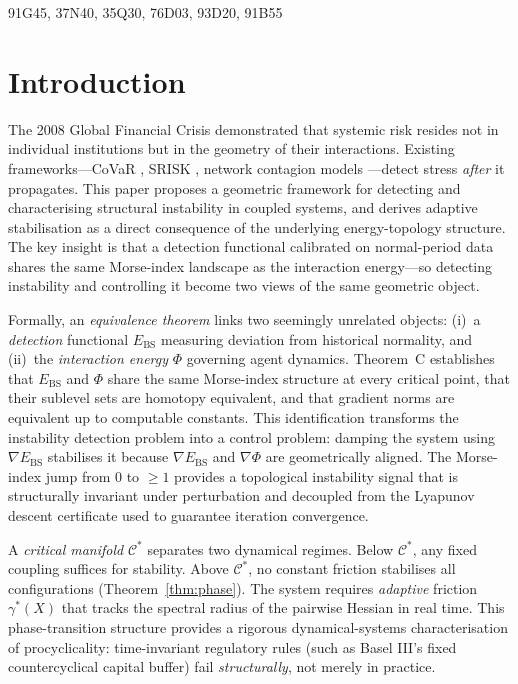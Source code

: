 \documentclass[final]{siamltex}
\providecommand{\grad}{\nabla}
\newcommand{\Ebs}{E_{\mathrm{BS}}}
\newcommand{\Cman}{\mathcal{C}^*}
\begin{document}
\begin{AMS}
91G45, 37N40, 35Q30, 76D03, 93D20, 91B55
\end{AMS}

\section{Introduction}\label{sec:intro}

The 2008 Global Financial Crisis demonstrated that systemic risk
resides not in individual institutions but in the geometry of
their interactions. Existing frameworks---CoVaR
\cite{adrian2016covar}, SRISK \cite{brownlees2017srisk},
network contagion models \cite{acemoglu2015systemic,
elliott2014financial}---detect stress \emph{after} it
propagates. This paper proposes a geometric framework for
detecting and characterising structural instability in coupled
systems, and derives adaptive stabilisation as a direct consequence
of the underlying energy-topology structure.  The key insight is
that a detection functional calibrated on normal-period data
shares the same Morse-index landscape as the interaction
energy---so detecting instability and controlling it become two
views of the same geometric object.

Formally, an \emph{equivalence theorem} links two seemingly
unrelated objects: (i)~a \emph{detection} functional $\Ebs$
measuring deviation from historical normality, and (ii)~the
\emph{interaction energy} $\Phi$ governing agent dynamics.
Theorem~C establishes that $\Ebs$ and $\Phi$ share the same
Morse-index structure at every critical point, that their sublevel
sets are homotopy equivalent, and that gradient norms are equivalent
up to computable constants.  This identification transforms
the instability detection problem into a control problem: damping
the system using $\grad\Ebs$ stabilises it because $\grad\Ebs$ and
$\grad\Phi$ are geometrically aligned.  The Morse-index jump from
$0$ to $\ge 1$ provides a topological instability signal that is
structurally invariant under perturbation and decoupled from the
Lyapunov descent certificate used to guarantee iteration
convergence.

A \emph{critical manifold} $\Cman$ separates two dynamical
regimes. Below $\Cman$, any fixed coupling suffices for stability.
Above $\Cman$, no constant friction stabilises all configurations
(Theorem~\ref{thm:phase}). The system requires \emph{adaptive}
friction $\gamma^*(X)$ that tracks the spectral radius of the
pairwise Hessian in real time. This phase-transition structure
provides a rigorous dynamical-systems characterisation of
procyclicality: time-invariant regulatory rules (such as Basel
III's fixed countercyclical capital buffer) fail
\emph{structurally}, not merely in practice.
\end{document}
